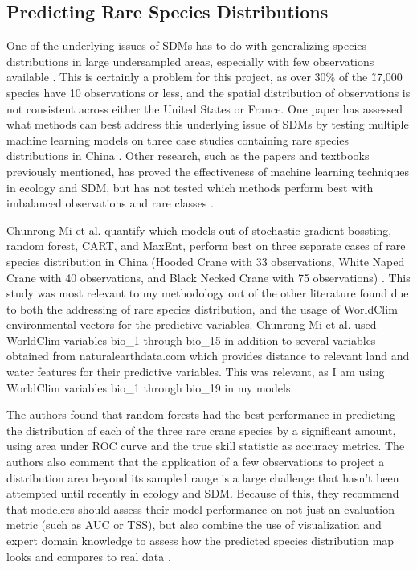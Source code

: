 \documentclass[12pt, oneside]{article}
\begin{document}
\begin{normalsize}
\subsection{Predicting Rare Species Distributions}

One of the underlying issues of SDMs has to do with generalizing species distributions in large undersampled areas, especially with few observations available \cite{mi2017choose}. This is certainly a problem for this project, as over 30\% of the \~17,000 species have 10 observations or less, and the spatial distribution of observations is not consistent across either the United States or France. One paper has assessed what methods can best address this underlying issue of SDMs by testing multiple machine learning models on three case studies containing rare species distributions in China \cite{mi2017choose}. Other research, such as the papers and textbooks previously mentioned, has proved the effectiveness of machine learning techniques in ecology and SDM, but has not tested which methods perform best with imbalanced observations and rare classes \cite{cutler2007random}.

Chunrong Mi et al. quantify which models out of stochastic gradient bossting, random forest, CART, and MaxEnt, perform best on three separate cases of rare species distribution in China (Hooded Crane with 33 observations, White Naped Crane with 40 observations, and Black Necked Crane with 75 observations) \cite{mi2017choose}. This study was most relevant to my methodology out of the other literature found due to both the addressing of rare species distribution, and the usage of WorldClim environmental vectors for the predictive variables. Chunrong Mi et al. used WorldClim variables bio\_1 through bio\_15 in addition to several variables obtained from naturalearthdata.com which provides distance to relevant land and water features for their predictive variables. This was relevant, as I am using WorldClim variables bio\_1 through bio\_19 in my models.

The authors found that random forests had the best performance in predicting the distribution of each of the three rare crane species by a significant amount, using area under ROC curve and the true skill statistic as accuracy metrics. The authors also comment that the application of a few observations to project a distribution area beyond its sampled range is a large challenge that hasn't been attempted until recently in ecology and SDM. Because of this, they recommend that modelers should assess their model performance on not just an evaluation metric (such as AUC or TSS), but also combine the use of visualization and expert domain knowledge to assess how the predicted species distribution map looks and compares to real data \cite{mi2017choose}.

\end{normalsize}
\end{document}
